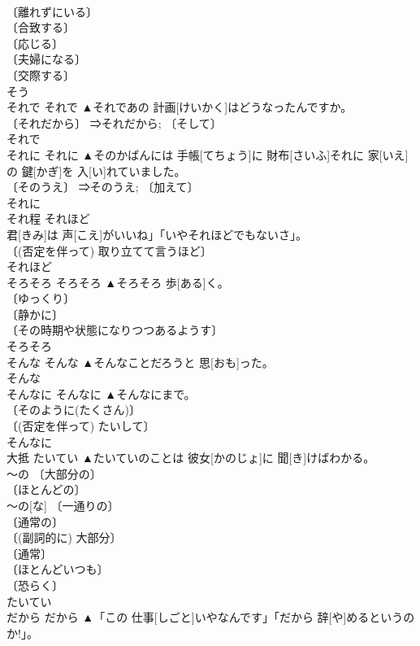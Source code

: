 \documentclass[8pt]{extreport}
\begin{document}
\begin{CJK}{UTF8}{min}
\\	〔離れずにいる〕 
\\	〔合致する〕 
\\	〔応じる〕 
\\	〔夫婦になる〕 
\\	〔交際する〕 
\\	[⇒そいとげる]		そう	
\\	それで	それで	▲それであの 計画[けいかく]はどうなったんですか。	
\\	〔それだから〕 ⇒それだから; 〔そして〕 
\\	それで	
\\	それに	それに	▲そのかばんには 手帳[てちょう]に 財布[さいふ]それに 家[いえ]の 鍵[かぎ]を 入[い]れていました。	
\\	〔そのうえ〕 ⇒そのうえ; 〔加えて〕 
\\	それに	
\\	それ程	それほど	
\\	君[きみ]は 声[こえ]がいいね」「いやそれほどでもないさ」。	
\\	〔(否定を伴って) 取り立てて言うほど〕 
\\	[⇒そんなに]		それほど	
\\	そろそろ	そろそろ	▲そろそろ 歩[ある]く。	
\\	〔ゆっくり〕 
\\	〔静かに〕 
\\	〔その時期や状態になりつつあるようす〕 
\\	そろそろ	
\\	そんな	そんな	▲そんなことだろうと 思[おも]った。	
\\	そんな	
\\	そんなに	そんなに	▲そんなにまで。	
\\	〔そのように(たくさん)〕 
\\	〔(否定を伴って) たいして〕 
\\	そんなに	
\\	大抵	たいてい	▲たいていのことは 彼女[かのじょ]に 聞[き]けばわかる。	
\\	～の 〔大部分の〕 
\\	〔ほとんどの〕 
\\	～の[な] 〔一通りの〕 
\\	〔通常の〕 
\\	〔(副詞的に) 大部分〕 
\\	〔通常〕 
\\	〔ほとんどいつも〕 
\\	〔恐らく〕 
\\	たいてい	
\\	だから	だから	▲「この 仕事[しごと]いやなんです」「だから 辞[や]めるというのか!」。	

\end{CJK}
\end{document}
